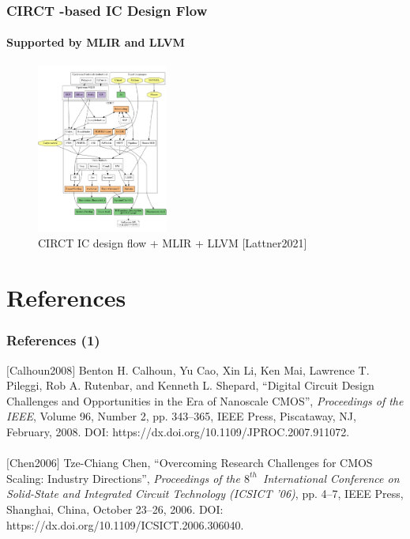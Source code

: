 \documentclass[xcolor={usenames,dvipsnames},hyperref={hyperindex,bookmarks}]{beamer}
\begin{document}
\begin{frame}
	\frametitle{CIRCT -based IC Design Flow}
	\framesubtitle{Supported by MLIR and LLVM}
	
	\begin{figure}
		\centering
		\includegraphics[height=2.2in]{./pics/CIRCTMLIR}
		\caption{CIRCT IC design flow + MLIR + LLVM [Lattner2021]}
	\end{figure}
\end{frame}





\section*{References}


\begin{frame}
	\frametitle{References (1)}
	
	$[$Calhoun2008$]$ Benton H. Calhoun, Yu Cao, Xin Li, Ken Mai, Lawrence T. Pileggi, Rob A. Rutenbar, and Kenneth L. Shepard, ``Digital Circuit Design Challenges and Opportunities in the Era of Nanoscale {CMOS}'', {\it Proceedings of the {IEEE}}, Volume 96, Number 2, pp. 343--365, {IEEE} Press, Piscataway, {NJ}, February, 2008. DOI: https://dx.doi.org/10.1109/JPROC.2007.911072. \\
	\ \\
	$[$Chen2006$]$ Tze-Chiang Chen, ``Overcoming Research Challenges for {CMOS} Scaling: Industry Directions'', {\it Proceedings of the $8^{th}$\ International Conference on Solid-State and Integrated Circuit Technology ({ICSICT '06})}, pp. 4--7, {IEEE} Press, Shanghai, China, October 23--26, 2006. DOI: https://dx.doi.org/10.1109/ICSICT.2006.306040. \\

\end{frame}
\end{document}
